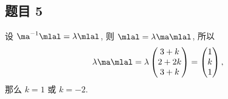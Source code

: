 \subsection*{ 题目 5 }
\begin{solution}
设 $\ma^{-1}\mlal = \lambda \mlal$, 则 $\mlal = \lambda \ma \mlal$, 所以
\[
    \lambda \ma \mlal = \lambda \begin{pmatrix}
    3 + k \\ 2 + 2k \\ 3 + k
\end{pmatrix} = \begin{pmatrix}
    1 \\ k \\ 1
\end{pmatrix},
\]
那么 $k = 1$ 或 $k = -2$.
\end{solution}